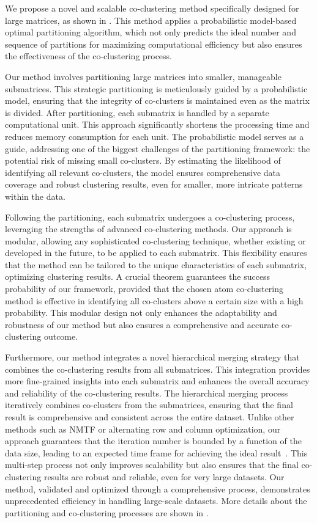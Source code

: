 \documentclass[journal]{IEEEtran}
\renewcommand{\cite}[1]{~\autocite{#1}}
\begin{document}
We propose a novel and scalable co-clustering method specifically designed for large matrices, as shown in . This method applies a probabilistic model-based optimal partitioning algorithm, which not only predicts the ideal number and sequence of partitions for maximizing computational efficiency but also ensures the effectiveness of the co-clustering process.

Our method involves partitioning large matrices into smaller, manageable submatrices. This strategic partitioning is meticulously guided by a probabilistic model, ensuring that the integrity of co-clusters is maintained even as the matrix is divided. After partitioning, each submatrix is handled by a separate computational unit. This approach significantly shortens the processing time and reduces memory consumption for each unit. The probabilistic model serves as a guide, addressing one of the biggest challenges of the partitioning framework: the potential risk of missing small co-clusters. By estimating the likelihood of identifying all relevant co-clusters, the model ensures comprehensive data coverage and robust clustering results, even for smaller, more intricate patterns within the data.

Following the partitioning, each submatrix undergoes a co-clustering process, leveraging the strengths of advanced co-clustering methods. Our approach is modular, allowing any sophisticated co-clustering technique, whether existing or developed in the future, to be applied to each submatrix. This flexibility ensures that the method can be tailored to the unique characteristics of each submatrix, optimizing clustering results. A crucial theorem guarantees the success probability of our framework, provided that the chosen atom co-clustering method is effective in identifying all co-clusters above a certain size with a high probability. This modular design not only enhances the adaptability and robustness of our method but also ensures a comprehensive and accurate co-clustering outcome.

Furthermore, our method integrates a novel hierarchical merging strategy that combines the co-clustering results from all submatrices. This integration provides more fine-grained insights into each submatrix and enhances the overall accuracy and reliability of the co-clustering results. The hierarchical merging process iteratively combines co-clusters from the submatrices, ensuring that the final result is comprehensive and consistent across the entire dataset. Unlike other methods such as NMTF or alternating row and column optimization, our approach guarantees that the iteration number is bounded by a function of the data size, leading to an expected time frame for achieving the ideal result\cite{wang2011FastNonnegativeMatrix}. This multi-step process not only improves scalability but also ensures that the final co-clustering results are robust and reliable, even for very large datasets. Our method, validated and optimized through a comprehensive process, demonstrates unprecedented efficiency in handling large-scale datasets.
More details about the partitioning and co-clustering processes are shown in .
\end{document}
